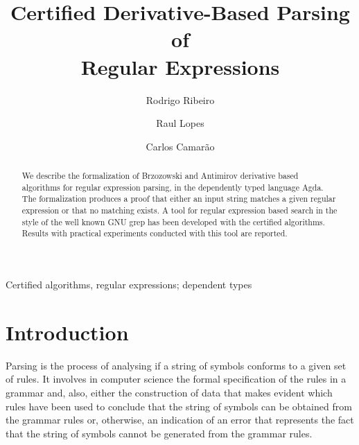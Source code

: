 \documentclass[review]{elsarticle}
\begin{document}
\begin{frontmatter}

\title{Certified Derivative-Based Parsing of\\ Regular Expressions}

\author[rgr]{Rodrigo Ribeiro}
\address[rgr]{Dep. de Computa\c{c}\~ao e Sistemas, Universidade
  Federal de Ouro Preto, ICEA, Jo\~ao Monlevade, Minas Gerais, Brasil}

\author{Raul Lopes}
\address{Dep. de Computa\c{c}\~ao, Universidade
  Federal de Ouro Preto, ICEB, Campus Universit\'ario Morro do
  Cruzeiro, Ouro Preto, Minas Gerais, Brasil}


\author{Carlos Camar\~ao}
\address{Dep. de Ci\^encia da Computa\c{c}\~ao, Universidade Federal
  de Minas Gerais, Av. Ant\^onio Carlos 6627, Belo Horizonte, Minas Gerais, Brasil}


\begin{abstract}

We describe the formalization of Brzozowski and Antimirov derivative
based algorithms for regular expression parsing, in the dependently
typed language Agda. The formalization produces a proof that either an
input string matches a given regular expression or that no matching
exists. A tool for regular expression based search in the style of the
well known GNU grep has been developed with the certified algorithms.
Results with practical experiments conducted with this tool are
reported.

\end{abstract}

\begin{keyword}
Certified algorithms, regular expressions; dependent types
\end{keyword}

\end{frontmatter}


\section{Introduction}\label{sec:intro}

Parsing is the process of analysing if a string of symbols conforms to
a given set of rules. It involves in computer science the formal
specification of the rules in a grammar and, also, either the
construction of data that makes evident which rules have been used to
conclude that the string of symbols can be obtained from the grammar
rules or, otherwise, an indication of an error that represents the
fact that the string of symbols cannot be generated from the grammar
rules.
\end{document}
